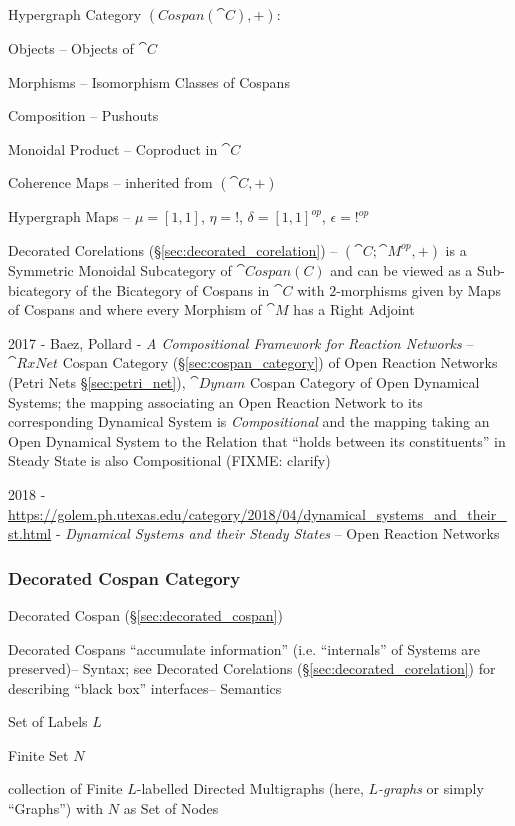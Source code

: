 Hypergraph Category $(Cospan(\cat{C}), +)$:

Objects -- Objects of $\cat{C}$

Morphisms -- Isomorphism Classes of Cospans

Composition -- Pushouts

Monoidal Product -- Coproduct in $\cat{C}$

Coherence Maps -- inherited from $(\cat{C}, +)$

Hypergraph Maps -- $\mu = [1,1]$, $\eta = !$, $\delta = [1,1]^{op}$,
$\epsilon = !^{op}$

Decorated Corelations (\S\ref{sec:decorated_corelation}) --
$(\cat{C};\cat{M}^{op}, +)$ is a Symmetric Monoidal Subcategory of
$\cat{Cospan(C)}$ and can be viewed as a Sub-bicategory of the
Bicategory of Cospans in $\cat{C}$ with $2$-morphisms given by Maps of
Cospans and where every Morphism of $\cat{M}$ has a Right Adjoint

2017 - Baez, Pollard - \emph{A Compositional Framework for Reaction Networks}
-- $\cat{RxNet}$ Cospan Category (\S\ref{sec:cospan_category}) of Open Reaction
Networks (Petri Nets \S\ref{sec:petri_net}), $\cat{Dynam}$ Cospan Category of
Open Dynamical Systems; the mapping associating an Open Reaction Network to its
corresponding Dynamical System is \emph{Compositional} and the mapping taking
an Open Dynamical System to the Relation that ``holds between its
constituents'' in Steady State is also Compositional (FIXME: clarify)

2018 - \url{https://golem.ph.utexas.edu/category/2018/04/dynamical_systems_and_their_st.html} -
\emph{Dynamical Systems and their Steady States} --
Open Reaction Networks



\subsubsection{Decorated Cospan Category}
\label{sec:decorated_cospan_category}

Decorated Cospan (\S\ref{sec:decorated_cospan})

Decorated Cospans ``accumulate information'' (i.e. ``internals'' of
Systems are preserved)-- Syntax; see Decorated Corelations
(\S\ref{sec:decorated_corelation}) for describing ``black box''
interfaces-- Semantics

Set of Labels $L$

Finite Set $N$

collection of Finite $L$-labelled Directed Multigraphs (here,
\emph{$L$-graphs} or simply ``Graphs'') with $N$ as Set of Nodes

